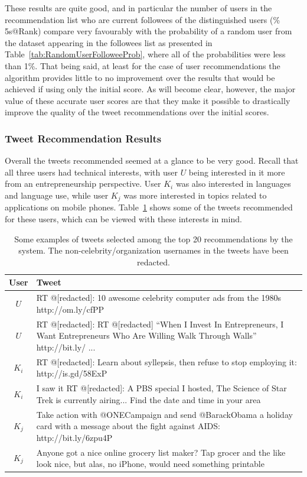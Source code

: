 These results are quite good, and in particular the number of users in the recommendation list who are current followees of the distinguished users (\% 5s@Rank) compare very favourably with the probability of a random user from the dataset appearing in the followees list as presented in Table~\ref{tab:RandomUserFolloweeProb}, where all of the probabilities were less than 1\%. That being said, at least for the case of user recommendations the algorithm provides little to no improvement over the results that would be achieved if using only the initial score. As will become clear, however, the major value of these accurate user scores are that they make it possible to drastically improve the quality of the tweet recommendations over the initial scores.



\subsubsection{Tweet Recommendation Results}

Overall the tweets recommended seemed at a glance to be very good. Recall that all three users had technical interests, with user $U$ being interested in it more from an entrepreneurship perspective. User $K_{i}$ was also interested in languages and language use, while user $K_{j}$ was more interested in topics related to applications on mobile phones. Table~\ref{tab:TweetsRecommended} shows some of the tweets recommended for these users, which can be viewed with these interests in mind.

\begin{table}
\centering
\begin{tabular}{c|p{12.5cm}}
{\bf User} & {\bf Tweet} \\ \hline
 $U$ & RT @[redacted]: 10 awesome celebrity computer ads from the 1980s http://om.ly/cfPP \\ \hline
 $U$ & RT @[redacted]: RT @[redacted] ``When I Invest In Entrepreneurs, I Want Entrepreneurs Who Are Willing Walk Through Walls'' http://bit.ly/ ...  \\ \hline
 $K_{i}$ & RT @[redacted]: Learn about syllepsis, then refuse to stop employing it: http://is.gd/58ExP \\ \hline
 $K_{i}$ & I saw it RT @[redacted]: A PBS special I hosted, The Science of Star Trek is currently airing... Find the date and time in your area  \\ \hline
 $K_{j}$ & Take action with @ONECampaign and send @BarackObama a holiday card with a message about the fight against AIDS: http://bit.ly/6zpu4P \\ \hline
 $K_{j}$ & Anyone got a nice online grocery list maker? Tap grocer and the like look nice, but alas, no iPhone, would need something printable \\
\end{tabular}
\caption[Example tweets selected by the algorithm]{Some examples of tweets selected among the top 20 recommendations by the system. The non-celebrity/organization usernames in the tweets have been redacted.}
\label{tab:TweetsRecommended}
\end{table}

